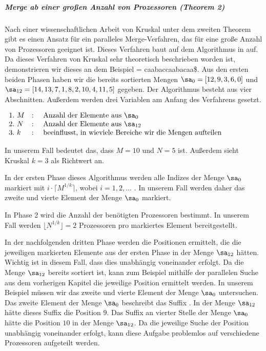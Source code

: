 \subparagraph*{Merge ab einer großen Anzahl von Prozessoren (Theorem 2)}
\label{dc3:parallel:theorem2}
Nach einer wissenschaftlichen Arbeit von Kruskal \cite[p.~943,944]{merge:kruskal} unter dem zweiten Theorem gibt es einen Ansatz für ein paralleles Merge-Verfahren, das für eine große Anzahl von Prozessoren geeignet ist. Dieses Verfahren baut auf dem Algorithmus in \cite{merge:valiant} auf.
Da dieses Verfahren von Kruskal sehr theoretisch beschrieben worden ist, demonstrieren wir dieses an dem Beispiel  = caabaccaabacaa\$. Aus den ersten beiden Phasen haben wir die bereits sortierten Mengen $\sa_{0} = [12, 9, 3, 6, 0]$ und $\sa_{12} = [14, 13, 7, 1, 8, 2, 10, 4, 11, 5]$ gegeben.
Der Algorithmus besteht aus vier Abschnitten. Außerdem werden drei Variablen am Anfang des Verfahrens gesetzt.

$\begin{array}{lcl}
1. \text{  } M & : & \text{ Anzahl der Elemente aus } \sa_0 \\
2. \text{  } N	& : & \text{ Anzahl der Elemente aus } \sa_{12} \\
3. \text{  } k & : & \text{ beeinflusst, in wieviele Bereiche wir die Mengen aufteilen}
\end{array}$

In unserem Fall bedeutet das, dass $M = 10$ und $N = 5$ ist. Außerdem sieht Kruskal $k = 3$ als Richtwert an.

In der ersten Phase dieses Algorithmus werden alle Indizes der Menge $\sa_0$ markiert mit $i \cdot \lceil M^{1/k} \rceil$, wobei $i = 1, 2, ...$ . In unserem Fall werden daher das zweite und vierte Element der Menge $\sa_0$ markiert.

In Phase 2 wird die Anzahl der benötigten Prozessoren bestimmt. In unserem Fall werden $\lfloor N^{1/k} \rfloor = 2$ Prozessoren pro markiertes Element bereitgestellt.

In der nachfolgenden dritten Phase werden die Positionen ermittelt, die die jeweiligen markierten Elemente aus der ersten Phase in der Menge $\sa_{12}$ hätten. Wichtig ist in diesem Fall, dass dies unabhängig voneinander erfolgt. Da die Menge $\sa_{12}$ bereits sortiert ist, kann zum Beispiel mithilfe der parallelen Suche aus dem vorherigen Kapitel die jeweilige Position ermittelt werden. In unserem Beispiel müssen wir das zweite und vierte Element der Menge $\sa_0$ untersuchen. Das zweite Element der Menge $\sa_0$ beschreibt das Suffix . In der Menge $\sa_{12}$ hätte dieses Suffix die Position $9$. Das Suffix  an vierter Stelle der Menge $\sa_0$ hätte die Position $10$ in der Menge $\sa_{12}$.
Da die jeweilige Suche der Position unabhängig voneinander erfolgt, kann diese Aufgabe problemlos auf verschiedene Prozessoren aufgeteilt werden.

